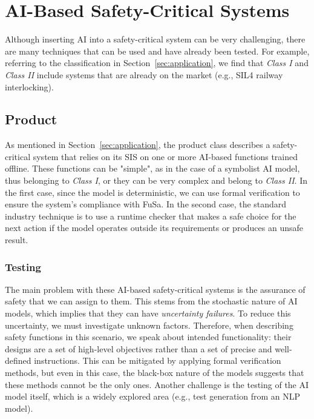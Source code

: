 \chapter{AI-Based Safety-Critical Systems}
Although inserting AI into a safety-critical system can be very challenging, there are many techniques that can be used and have already been tested. For example, referring to the classification in Section~\ref{sec:application}, we find that \textit{Class I} and \textit{Class II} include systems that are already on the market (e.g., SIL4 railway interlocking).

\section{Product}
As mentioned in Section~\ref{sec:application}, the product class describes a safety-critical system that relies on its SIS on one or more AI-based functions trained offline. These functions can be "simple", as in the case of a symbolist AI model, thus belonging to \textit{Class I}, or they can be very complex and belong to \textit{Class II}. In the first case, since the model is deterministic, we can use formal verification to ensure the system's compliance with FuSa. In the second case, the standard industry technique is to use a runtime checker that makes a safe choice for the next action if the model operates outside its requirements or produces an unsafe result.

\subsection{Testing}
The main problem with these AI-based safety-critical systems is the assurance of safety that we can assign to them. This stems from the stochastic nature of AI models, which implies that they can have \textit{uncertainty failures}. To reduce this uncertainty, we must investigate unknown factors. Therefore, when describing safety functions in this scenario, we speak about intended functionality: their designs are a set of high-level objectives rather than a set of precise and well-defined instructions. This can be mitigated by applying formal verification methods, but even in this case, the black-box nature of the models suggests that these methods cannot be the only ones. Another challenge is the testing of the AI model itself, which is a widely explored area (e.g., test generation from an NLP model).

